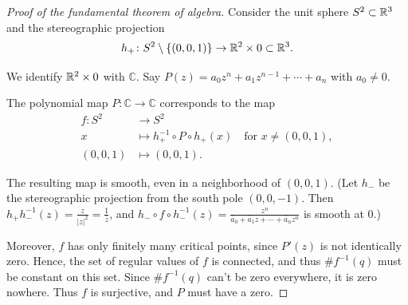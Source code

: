 \begin{proof}[Proof of the fundamental theorem of algebra]
    Consider the unit sphere $S^2 \subset \mathbb{R}^3$ and the stereographic projection
    \[
        h_+ \colon S^2 \setminus \{(0,0,1)\} \to \mathbb{R}^2 \times 0 \subset \mathbb{R}^3.
    \]
    \begin{center}
    \end{center}

    We identify $\mathbb{R}^2 \times 0$ with $\mathbb{C}$. Say $P(z) = a_0 z^n + a_1 z^{n-1} + \cdots + a_n$ with $a_0 \neq 0$.

    The polynomial map $P \colon \mathbb{C} \to \mathbb{C}$ corresponds to the map
    \begin{align*}
        f \colon S^2 &\to S^2 \\
        x &\mapsto h_+^{-1} \circ P \circ h_+(x) \quad \text{for } x \neq (0,0,1), \\
        (0,0,1) &\mapsto (0,0,1).
    \end{align*}

    The resulting map is smooth, even in a neighborhood of $(0,0,1)$. (Let $h_-$ be the stereographic projection from the south pole $(0,0,-1)$. Then $h_+ h_-^{-1}(z) = \frac{z}{|z|^2} = \frac{1}{\bar{z}}$, and $h_- \circ f \circ h_-^{-1}(z) = \frac{z^n}{\bar{a}_0 + \bar{a}_1 z + \cdots + \bar{a}_n z^n}$ is smooth at $0$.)

    Moreover, $f$ has only finitely many critical points, since $P'(z)$ is not identically zero. Hence, the set of regular values of $f$ is connected, and thus $\# f^{-1}(q)$ must be constant on this set. Since $\# f^{-1}(q)$ can't be zero everywhere, it is zero nowhere. Thus $f$ is surjective, and $P$ must have a zero.
\end{proof}
